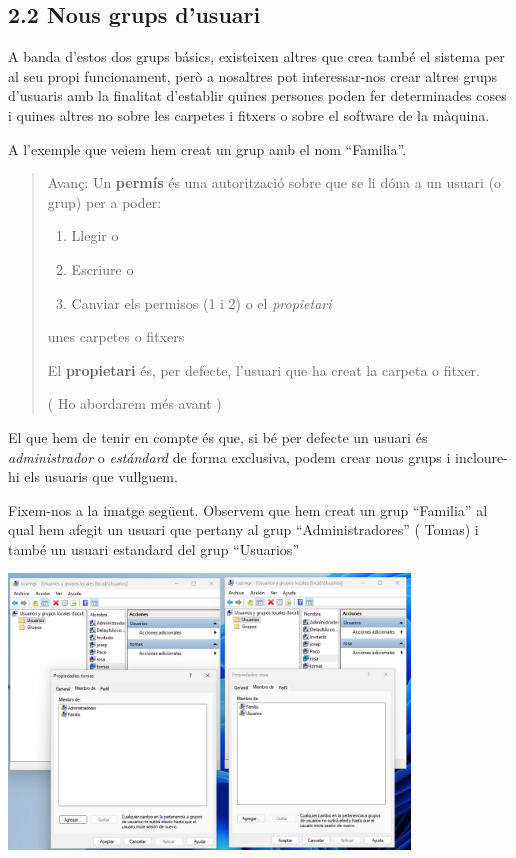 \documentclass[
  a4paper,
]{article}
\providecommand{\tightlist}{%
  \setlength{\itemsep}{0pt}\setlength{\parskip}{0pt}}
\begin{document}
\subsection{2.2 Nous grups d'usuari}\label{nous-grups-dusuari}

A banda d'estos dos grups básics, existeixen altres que crea també el
sistema per al seu propi funcionament, però a nosaltres pot
interessar-nos crear altres grups d'usuaris amb la finalitat d'establir
quines persones poden fer determinades coses i quines altres no sobre
les carpetes i fitxers o sobre el software de la màquina.

A l'exemple que veiem hem creat un grup amb el nom ``Familia''.

\begin{quote}
Avanç: Un \textbf{permís} és una autorització sobre que se li dóna a un
usuari (o grup) per a poder:

\begin{enumerate}
\def\labelenumi{\arabic{enumi}.}
\tightlist
\item
  Llegir o
\item
  Escriure o
\item
  Canviar els permisos (1 i 2) o el \emph{propietari}
\end{enumerate}

unes carpetes o fitxers

El \textbf{propietari} és, per defecte, l'usuari que ha creat la carpeta
o fitxer.

( Ho abordarem més avant )
\end{quote}

El que hem de tenir en compte és que, si bé per defecte un usuari és
\emph{administrador} o \emph{estándard} de forma exclusiva, podem crear
nous grups i incloure-hi els usuaris que vullguem.

Fixem-nos a la imatge següent. Observem que hem creat un grup
``Familia'' al qual hem afegit un usuari que pertany al grup
``Administradores'' ( Tomas) i també un usuari estandard del grup
``Usuarios''

\includegraphics[width=0.8\textwidth,height=\textheight]{png/mesdungrup.png}
\end{document}
